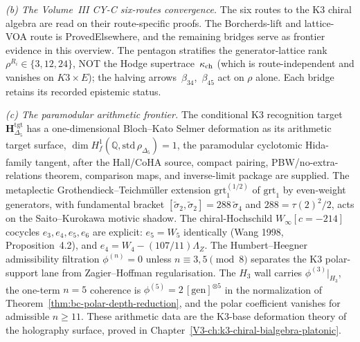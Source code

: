 \medskip

\noindent\emph{(b) The Volume~III CY-C six-routes
convergence.}\enspace
The six routes to the K3 chiral algebra are read on their
route-specific proofs. The Borcherds-lift and lattice-VOA
route is ProvedElsewhere, and the remaining bridges serve as
frontier evidence in this overview. The pentagon stratifies the
generator-lattice rank~$\rho^{R_i}\in\{3,12,24\}$, NOT the Hodge
supertrace~$\kappa_{\mathrm{ch}}$ (which is route-independent and vanishes on
$K3\times E$); the halving arrows~$\beta_{34}$,~$\beta_{45}$ act on
$\rho$ alone. Each bridge retains its recorded epistemic status.

\medskip

\noindent\emph{(c) The paramodular arithmetic frontier.}\enspace
The conditional K3 recognition target $\mathbf H_{\Delta_5}^{\mathrm{tgt}}$
has a one-dimensional Bloch--Kato Selmer deformation as its arithmetic
target surface,
$\dim H^1_f(\mathbb Q,\mathrm{std}\,\rho_{\Delta_5}) = 1$, the
paramodular cyclotomic Hida-family tangent, after the Hall/CoHA
source, compact pairing, PBW/no-extra-relations theorem, comparison
maps, and inverse-limit package are supplied. The
metaplectic Grothendieck--Teichm\"uller extension
$\mathrm{grt}_1^{(1/2)}$ of $\mathrm{grt}_1$ by even-weight
generators, with fundamental bracket
$[\widetilde\sigma_2,\widetilde\sigma_2] = 288\,\widetilde\sigma_4$
and $288 = \tau(2)^2/2$, acts on the Saito--Kurokawa motivic
shadow. The chiral-Hochschild $W_\infty[c=-214]$ cocycles
$e_3,e_4,e_5,e_6$ are explicit: $e_5 = W_5$ identically (Wang 1998,
Proposition~4.2), and $e_4 = W_4 - (107/11)\Lambda_Z$. The
Humbert--Heegner admissibility filtration
$\phi^{(n)}=0$ unless $n\equiv 3,5\pmod 8$ separates the K3
polar-support lane from Zagier--Hoffman regularisation. The $H_3$
wall carries $\phi^{(3)}|_{H_3}$, the one-term $n=5$ coherence is
$\phi^{(5)} = 2\,[\mathrm{gen}]^{\otimes 5}$ in the normalization of
Theorem~\ref{thm:bc-polar-depth-reduction}, and the polar
coefficient vanishes for admissible $n\ge 11$. These
arithmetic data are the K3-base deformation theory of the holography
surface, proved in Chapter~\ref{V3-ch:k3-chiral-bialgebra-platonic}.

\medskip

